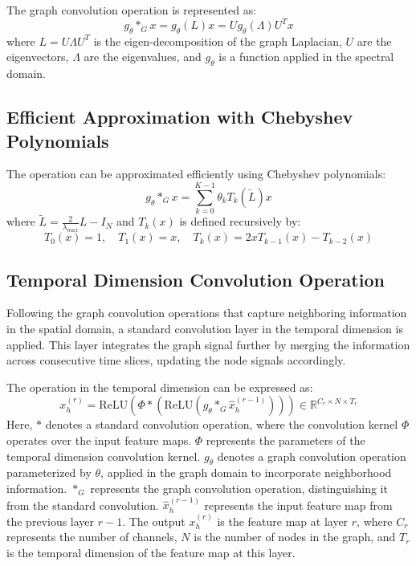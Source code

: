 \documentclass[conference]{IEEEtran}
\begin{document}
The graph convolution operation is represented as:
\begin{equation}
g_\theta \ast_G x = g_\theta(L) x = U g_\theta(\Lambda) U^T x
\end{equation}
where \( L = U \Lambda U^T \) is the eigen-decomposition of the graph Laplacian, \( U \) are the eigenvectors, \( \Lambda \) are the eigenvalues, and \( g_\theta \) is a function applied in the spectral domain.

\subsection*{Efficient Approximation with Chebyshev Polynomials}
The operation can be approximated efficiently using Chebyshev polynomials:
\begin{equation}
g_\theta \ast_G x = \sum_{k=0}^{K-1} \theta_k T_k(\tilde{L}) x
\end{equation}
where \( \tilde{L} = \frac{2}{\lambda_{max}} L - I_N \) and \( T_k(x) \) is defined recursively by:
\begin{equation}
T_0(x) = 1, \quad T_1(x) = x, \quad T_k(x) = 2x T_{k-1}(x) - T_{k-2}(x)
\end{equation}

\subsection{Temporal Dimension Convolution Operation}
Following the graph convolution operations that capture neighboring information in the spatial domain, a standard convolution layer in the temporal dimension is applied. This layer integrates the graph signal further by merging the information across consecutive time slices, updating the node signals accordingly.

The operation in the temporal dimension can be expressed as:
\begin{equation}
x_h^{(r)} = \text{ReLU}(\Phi \ast (\text{ReLU}(g_\theta \ast_G \hat{x}_h^{(r-1)}))) \in \mathbb{R}^{C_r \times N \times T_r}
\end{equation}
Here, \( \ast \) denotes a standard convolution operation, where the convolution kernel \( \Phi \) operates over the input feature maps. \( \Phi \) represents the parameters of the temporal dimension convolution kernel. \( g_\theta \) denotes a graph convolution operation parameterized by \( \theta \), applied in the graph domain to incorporate neighborhood information. \( \ast_G \) represents the graph convolution operation, distinguishing it from the standard convolution. \( \hat{x}_h^{(r-1)} \) represents the input feature map from the previous layer \( r-1 \). The output \( x_h^{(r)} \) is the feature map at layer \( r \), where \( C_r \) represents the number of channels, \( N \) is the number of nodes in the graph, and \( T_r \) is the temporal dimension of the feature map at this layer.
\end{document}
